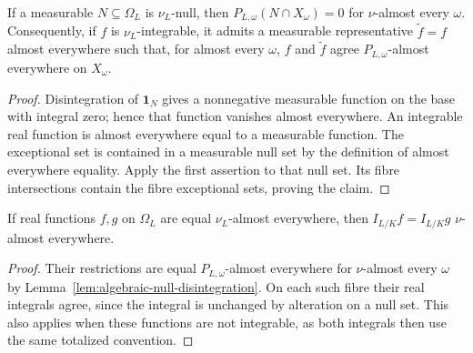 \begin{lemma}\label{lem:algebraic-null-disintegration}
\leanok
{}
If a measurable $N\subseteq\Omega_L$ is $\nu_L$-null, then
$P_{L,\omega}(N\cap X_\omega)=0$ for $\nu$-almost every $\omega$.
Consequently, if $f$ is $\nu_L$-integrable, it admits a measurable
representative $\widetilde f=f$ almost everywhere such that, for
almost every $\omega$, $f$ and $\widetilde f$ agree
$P_{L,\omega}$-almost everywhere on $X_\omega$.
\end{lemma}
\begin{proof}
Disintegration of $\mathbf1_N$ gives a nonnegative measurable
function on the base with integral zero; hence that function vanishes
almost everywhere. An integrable real function is almost everywhere
equal to a measurable function. The exceptional set is contained in
a measurable null set by the definition of almost everywhere equality.
Apply the first assertion to that null set. Its fibre intersections
contain the fibre exceptional sets, proving the claim.
\end{proof}

\begin{lemma}
\label{lem:algebraic-fibre-integral-ae}
\leanok
{}
If real functions $f,g$ on $\Omega_L$ are equal $\nu_L$-almost everywhere,
then $I_{L/K}f=I_{L/K}g$ $\nu$-almost everywhere.
\end{lemma}
\begin{proof}
Their restrictions are equal $P_{L,\omega}$-almost everywhere for
$\nu$-almost every $\omega$ by
Lemma~\ref{lem:algebraic-null-disintegration}. On each such fibre their
real integrals agree, since the integral is unchanged by alteration
on a null set. This also applies when these functions are not integrable,
as both integrals then use the same totalized convention.
\end{proof}

